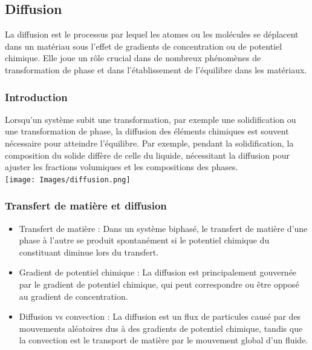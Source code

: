 \documentclass{article}
\begin{document}
    \subsection{Diffusion}
    La diffusion est le processus par lequel les atomes ou les molécules se déplacent dans un matériau sous l'effet de gradients de concentration ou de potentiel chimique. Elle joue un rôle crucial dans de nombreux phénomènes de transformation de phase et dans l'établissement de l'équilibre dans les matériaux.

        \subsubsection{Introduction}
        Lorsqu'un système subit une transformation, par exemple une solidification ou une transformation de phase, la diffusion des éléments chimiques est souvent nécessaire pour atteindre l'équilibre. Par exemple, pendant la solidification, la composition du solide diffère de celle du liquide, nécessitant la diffusion pour ajuster les fractions volumiques et les compositions des phases. \\
            \texttt{[image: Images/diffusion.png]}

        \subsubsection{Transfert de matière et diffusion}
        \begin{itemize}
            \item Transfert de matière : Dans un système biphasé, le transfert de matière d'une phase à l'autre se produit spontanément si le potentiel chimique du constituant diminue lors du transfert.
            \item Gradient de potentiel chimique : La diffusion est principalement gouvernée par le gradient de potentiel chimique, qui peut correspondre ou être opposé au gradient de concentration.
            \item Diffusion vs convection : La diffusion est un flux de particules causé par des mouvements aléatoires dus à des gradients de potentiel chimique, tandis que la convection est le transport de matière par le mouvement global d'un fluide.
        \end{itemize}
\end{document}

